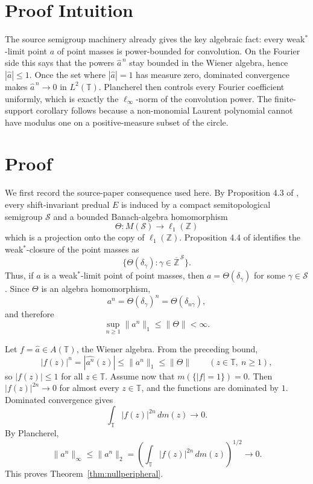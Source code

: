 \documentclass[11pt]{article}
\newcommand{\Z}{\mathbb Z}
\newcommand{\T}{\mathbb T}
\begin{document}
\section*{Proof Intuition}

The source semigroup machinery already gives the key algebraic fact: every
weak\(^*\)-limit point \(a\) of point masses is power-bounded for convolution.
On the Fourier side this says that the powers \(\widehat a^{\,n}\) stay
bounded in the Wiener algebra, hence \(|\widehat a|\le1\).  Once the set where
\(|\widehat a|=1\) has measure zero, dominated convergence makes
\(\widehat a^{\,n}\to0\) in \(L^2(\T)\).  Plancherel then controls every
Fourier coefficient uniformly, which is exactly the \(\ell_\infty\)-norm of
the convolution power.  The finite-support corollary follows because a
non-monomial Laurent polynomial cannot have modulus one on a positive-measure
subset of the circle.

\section*{Proof}

We first record the source-paper consequence used here.  By Proposition 4.3 of
\cite{DHSW}, every shift-invariant predual \(E\) is induced by a compact
semitopological semigroup \(\mathcal S\) and a bounded Banach-algebra
homomorphism
\[
  \Theta:M(\mathcal S)\to \ell_1(\Z)
\]
which is a projection onto the copy of \(\ell_1(\Z)\).  Proposition 4.4 of
\cite{DHSW} identifies the weak\(^*\)-closure of the point masses as
\[
  \{\Theta(\delta_\gamma):\gamma\in\overline{\Z}^{\,\mathcal S}\}.
\]
Thus, if \(a\) is a weak\(^*\)-limit point of point masses, then
\(a=\Theta(\delta_\gamma)\) for some \(\gamma\in\mathcal S\).  Since \(\Theta\)
is an algebra homomorphism,
\[
  a^n=\Theta(\delta_\gamma)^n=\Theta(\delta_{n\gamma}),
\]
and therefore
\[
  \sup_{n\ge1}\|a^n\|_1\le \|\Theta\|<\infty.
\]

Let \(f=\widehat a\in A(\T)\), the Wiener algebra.  From the preceding bound,
\[
  |f(z)|^n=|\widehat{a^n}(z)|\le \|a^n\|_1\le \|\Theta\|
  \qquad(z\in\T,\ n\ge1),
\]
so \(|f(z)|\le1\) for all \(z\in\T\).
Assume now that \(m(\{|f|=1\})=0\).  Then \(|f(z)|^{2n}\to0\) for almost every
\(z\in\T\), and the functions are dominated by \(1\).  Dominated convergence gives
\[
  \int_\T |f(z)|^{2n}\,dm(z)\longrightarrow0.
\]
By Plancherel,
\[
  \|a^n\|_\infty
  \le \|a^n\|_2
  = \left(\int_\T |f(z)|^{2n}\,dm(z)\right)^{1/2}
  \longrightarrow0.
\]
This proves Theorem~\ref{thm:nullperipheral}.
\end{document}
